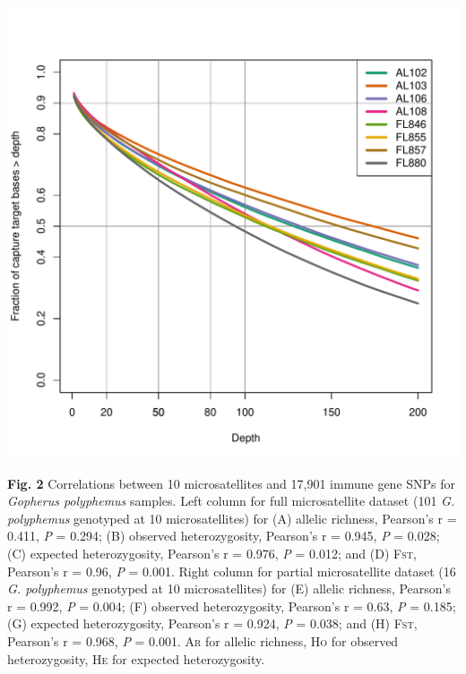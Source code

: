 \documentclass[english]{article}\usepackage[]{graphicx}\usepackage[]{color}
\makeatletter
\def\maxwidth{ %
  \ifdim\Gin@nat@width>\linewidth
    \linewidth
  \else
    \Gin@nat@width
  \fi
}
\newenvironment{knitrout}{}{} %
\makeatother
\begin{document}
\pagebreak{}
\noindent
\begin{knitrout}
\color{fgcolor}
\includegraphics[width=\maxwidth]{figure/Figure-2-1} 

\end{knitrout}
\noindent
\textbf{Fig. 2} Correlations between 10 microsatellites and 17,901 immune gene SNPs for \textit{Gopherus polyphemus} samples. Left column for full microsatellite dataset (101 \textit{G. polyphemus} genotyped at 10 microsatellites) for (A) allelic richness, Pearson's r = 0.411, \textit{P} = 0.294; (B) observed heterozygosity, Pearson's r = 0.945, \textit{P} = 0.028; (C) expected heterozygosity, Pearson's r = 0.976, \textit{P} = 0.012; and (D) \textsc{Fst}, Pearson's r = 0.96, \textit{P} = 0.001. Right column for partial microsatellite dataset (16 \textit{G. polyphemus} genotyped at 10 microsatellites) for (E) allelic richness, Pearson's r = 0.992, \textit{P} = 0.004; (F) observed heterozygosity, Pearson's r = 0.63, \textit{P} = 0.185; (G) expected heterozygosity, Pearson's r = 0.924, \textit{P} = 0.038; and (H) \textsc{Fst}, Pearson's r = 0.968, \textit{P} = 0.001. \textsc{Ar} for allelic richness, \textsc{Ho} for observed heterozygosity, \textsc{He} for expected heterozygosity. \\
\end{document}
